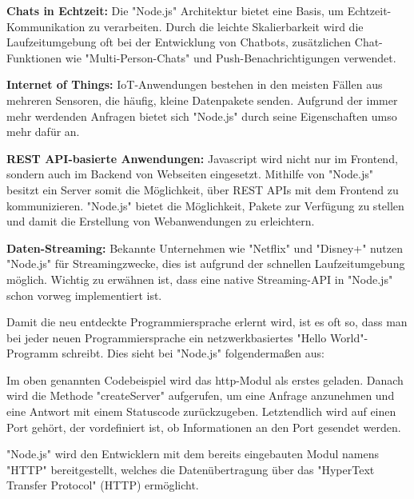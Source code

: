     \textbf{Chats in Echtzeit:}
    Die "Node.js" Architektur bietet eine Basis, um Echtzeit-Kom\-muni\-kati\-on zu verarbeiten. Durch die leichte Skalierbarkeit wird die Laufzeitumgebung oft bei der Entwicklung von Chatbots, zusätzlichen Chat-Funktionen wie "Multi-Person-Chats" und Push-Benachrichtigungen verwendet.

    \textbf{Internet of Things:}
    IoT-Anwendungen bestehen in den meisten Fällen aus mehreren Sensoren, die häufig, kleine Datenpakete senden. Aufgrund der immer mehr werdenden Anfragen bietet sich "Node.js" durch seine Eigenschaften umso mehr dafür an.

    \textbf{REST API-basierte Anwendungen:}
    Javascript wird nicht nur im Frontend, sondern auch im Backend von Webseiten eingesetzt. Mithilfe von "Node.js" besitzt ein Server somit die Möglichkeit, über REST APIs mit dem Frontend zu kommunizieren. "Node.js" bietet die Möglichkeit, Pakete zur Verfügung zu stellen und damit die Erstellung von Webanwendungen zu erleichtern. 

    \textbf{Daten-Streaming:}
    Bekannte Unternehmen wie "Netflix" und "Disney+" nutzen "Node.js" für Streamingzwecke, dies ist aufgrund der schnellen Laufzeitumgebung möglich. Wichtig zu erwähnen ist, dass eine native Streaming-API in "Node.js" schon vorweg implementiert ist.



Damit die neu entdeckte Programmiersprache erlernt wird, ist es oft so, dass man bei jeder neuen Programmiersprache ein netzwerkbasiertes "Hello World"-Programm schreibt. Dies sieht bei "Node.js" folgendermaßen aus:


Im oben genannten Codebeispiel wird das http-Modul als erstes geladen. Danach wird die Methode "createServer" aufgerufen, um eine Anfrage anzunehmen und eine Antwort mit einem Statuscode zurückzugeben. Letztendlich wird auf einen Port gehört, der vordefiniert ist, ob Informationen an den Port gesendet werden.

"Node.js" wird den Entwicklern mit dem bereits eingebauten Modul namens "HTTP" bereitgestellt, welches die Datenübertragung über das "HyperText Transfer Protocol" (HTTP) ermöglicht. \cite{HelloWorld}

\pagebreak
{}
\label{sec:npm}

